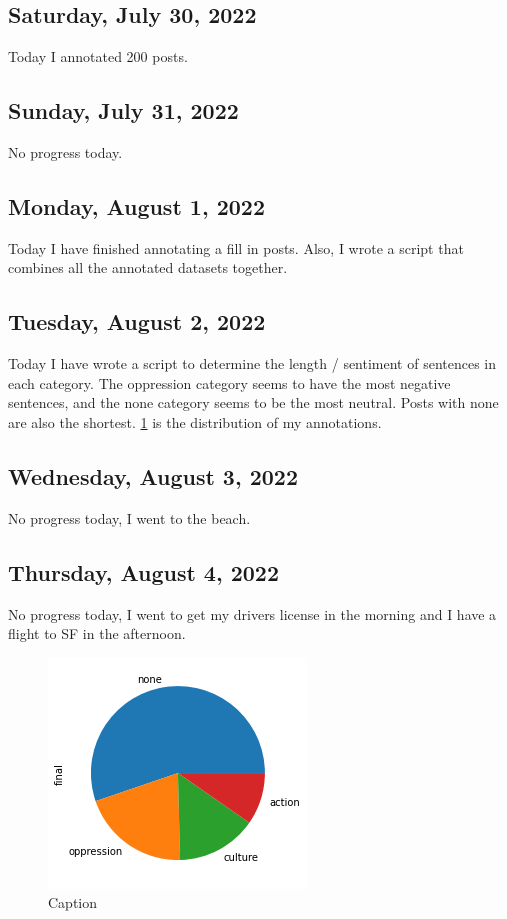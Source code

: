 \documentclass[11pt,letterpaper]{article}
\begin{document}
\subsection{Saturday, July 30, 2022}
Today I annotated 200 posts.

\subsection{Sunday, July 31, 2022}
No progress today.

\subsection{Monday, August 1, 2022}
Today I have finished annotating a fill in posts. Also, I wrote a script that combines all the annotated datasets together.

\subsection{Tuesday, August 2, 2022}
Today I have wrote a script to determine the length / sentiment of sentences in each category. The oppression category seems to have the most negative sentences, and the none category seems to be the most neutral. Posts with none are also the shortest. \ref{fig:ganning_dist} is the distribution of my annotations.

\subsection{Wednesday, August 3, 2022}
No progress today, I went to the beach.

\subsection{Thursday, August 4, 2022}
No progress today, I went to get my drivers license in the morning and I have a flight to SF in the afternoon.

\begin{figure}
    \centering
    \includegraphics[scale=1]{images/ganning_dist.png}
    \caption{Caption}
    \label{fig:ganning_dist}
\end{figure}
\end{document}

